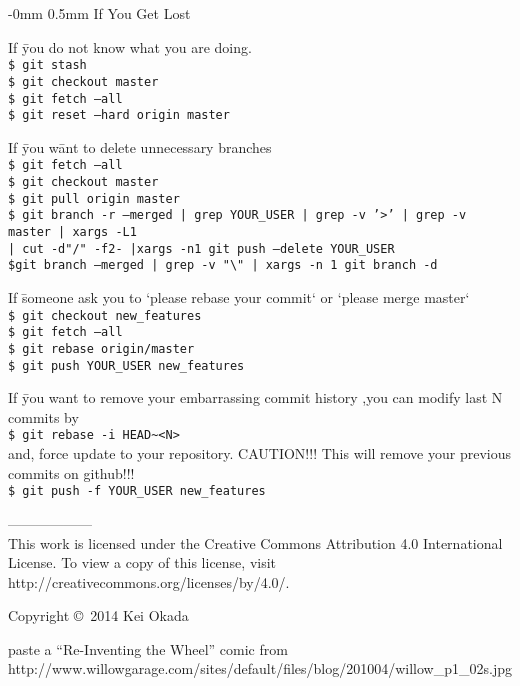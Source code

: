 \documentclass[10pt,landscape]{article}
\makeatletter
\renewcommand{\section}{\@startsection{section}{1}{0mm}%
                                {-0mm} %
                                {0.5mm}%
                                {\normalfont\large\bfseries}}
\makeatother
\begin{document}
\begin{multicols}{2}
\section{If You Get Lost}
\vspace{2.5mm}
\begin{tabbing}
If \=you do not know what you are doing.\\
\> \texttt{\$ git stash}\\
\> \texttt{\$ git checkout master}\\
\> \texttt{\$ git fetch --all}\\
\> \texttt{\$ git reset --hard origin master}\\  
\end{tabbing}

\begin{tabbing}
If \=you w\=ant to delete unnecessary branches\\
\> \texttt{\$ git fetch --all}\\
\> \texttt{\$ git checkout master}\\
\> \texttt{\$ git pull origin master}\\
\> \texttt{\$ git branch -r --merged |  grep YOUR\_USER |  grep -v '>' |  grep -v master |  xargs -L1}\\
\>\> \texttt{|  cut -d"/" -f2- |xargs -n1 git push --delete YOUR\_USER}\\
\> \texttt{\$git branch --merged | grep -v "\textbackslash *" | xargs -n 1 git branch -d}\\
\end{tabbing}

\begin{tabbing}
If \=someone ask you to `please rebase your commit` or `please merge master`\\
\> \texttt{\$ git checkout new\_features}\\  
\> \texttt{\$ git fetch --all}\\
\> \texttt{\$ git rebase origin/master}\\
\> \texttt{\$ git push YOUR\_USER new\_features}\\  
\end{tabbing}

\begin{tabbing}
If \=you want to remove your embarrassing commit history %
,you can modify last N commits by\\
\> \texttt{\$ git rebase -i HEAD\textasciitilde<N>}\\
and, force update to your repository. CAUTION!!! This will remove your
previous commits on github!!!\\
\> \texttt{\$ git push -f YOUR\_USER new\_features}\\  
\end{tabbing}
------------------\\
\scriptsize
This work is licensed under the Creative Commons Attribution 4.0
International License. To view a copy of this license, visit
http://creativecommons.org/licenses/by/4.0/.

Copyright \copyright\ 2014 Kei Okada

\end{multicols}
\newpage

\begin{center}
paste a ``Re-Inventing the Wheel'' comic from
http://www.willowgarage.com/sites/default/files/blog/201004/willow\_p1\_02s.jpg
\end{center}
\end{document}
